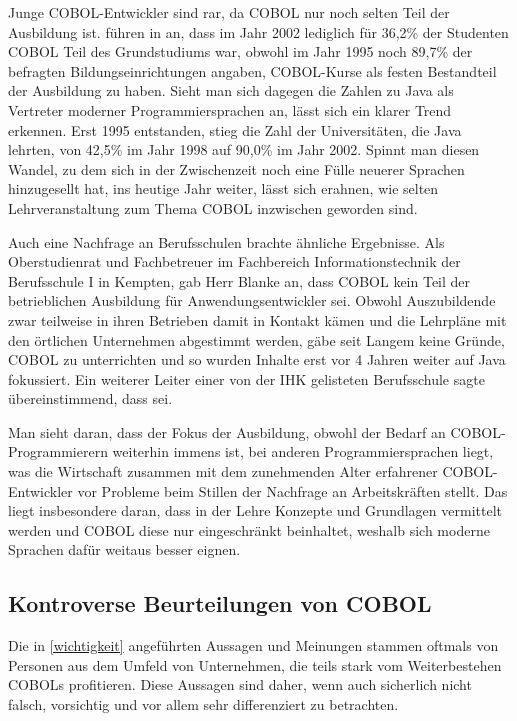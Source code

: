 Junge COBOL-Entwickler sind rar, da COBOL nur noch selten Teil der Ausbildung ist. \citeauthor{doke_cobol_2005} führen in  an, dass im Jahr 2002 lediglich für 36,2\% der Studenten COBOL Teil des Grundstudiums war, obwohl im Jahr 1995 noch 89,7\% der befragten Bildungseinrichtungen angaben, COBOL-Kurse als festen Bestandteil der Ausbildung zu haben. Sieht man sich dagegen die Zahlen zu Java als Vertreter moderner Programmiersprachen an, lässt sich ein klarer Trend erkennen. Erst 1995 entstanden, stieg die Zahl der  Universitäten, die Java lehrten, von 42,5\% im Jahr 1998 auf 90,0\% im Jahr 2002. Spinnt man diesen Wandel, zu dem sich in der Zwischenzeit noch eine Fülle neuerer Sprachen hinzugesellt hat, ins heutige Jahr weiter, lässt sich erahnen, wie selten Lehrveranstaltung zum Thema COBOL inzwischen geworden sind.

Auch eine Nachfrage an Berufsschulen brachte ähnliche Ergebnisse. Als Oberstudienrat und Fachbetreuer im Fachbereich Informationstechnik der Berufsschule I in Kempten, gab Herr Blanke an, dass COBOL kein Teil der betrieblichen Ausbildung für Anwendungsentwickler sei.  Obwohl Auszubildende zwar teilweise in ihren Betrieben damit in Kontakt kämen und die Lehrpläne mit den örtlichen Unternehmen abgestimmt werden, gäbe seit Langem keine Gründe, COBOL zu unterrichten und so wurden Inhalte erst vor 4 Jahren weiter auf Java fokussiert. Ein weiterer Leiter einer von der IHK gelisteten Berufsschule sagte übereinstimmend, dass  sei.

Man sieht daran, dass der Fokus der Ausbildung, obwohl der Bedarf an COBOL-Programmierern weiterhin immens ist, bei anderen Programmiersprachen liegt, was die Wirtschaft zusammen mit dem zunehmenden Alter erfahrener COBOL-Entwickler vor Probleme beim Stillen der Nachfrage an Arbeitskräften stellt. Das liegt insbesondere daran, dass in der Lehre Konzepte und Grundlagen vermittelt werden und COBOL diese nur eingeschränkt beinhaltet, weshalb sich moderne Sprachen dafür weitaus besser eignen.

\subsection*{Kontroverse Beurteilungen von COBOL}
Die in \autoref{wichtigkeit} angeführten Aussagen und Meinungen stammen oftmals von Personen aus dem Umfeld von Unternehmen, die teils stark vom Weiterbestehen COBOLs profitieren. Diese Aussagen sind daher, wenn auch sicherlich nicht falsch, vorsichtig und vor allem sehr differenziert zu betrachten.

